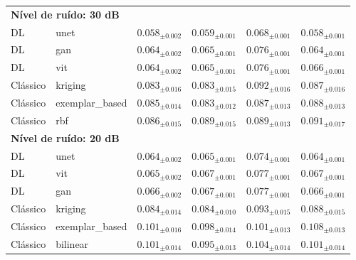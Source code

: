\begin{table}[htbp]
{\begin{tabular}{llcccc}
\midrule
\multicolumn{6}{l}{\textbf{Nível de ruído: 30 dB}} \\
DL & unet & $\mathbf{0.058_{\pm 0.002}}$ & $\mathbf{0.059_{\pm 0.001}}$ & $\mathbf{0.068_{\pm 0.001}}$ & $\mathbf{0.058_{\pm 0.001}}$ \\
DL & gan & \underline{$0.064_{\pm 0.002}$} & \underline{$0.065_{\pm 0.001}$} & \underline{$0.076_{\pm 0.001}$} & \underline{$0.064_{\pm 0.001}$} \\
DL & vit & \textit{$0.064_{\pm 0.002}$} & \textit{$0.065_{\pm 0.001}$} & \textit{$0.076_{\pm 0.001}$} & \textit{$0.066_{\pm 0.001}$} \\
Clássico & kriging & $0.083_{\pm 0.016}$ & $0.083_{\pm 0.015}$ & $0.092_{\pm 0.016}$ & $0.087_{\pm 0.016}$ \\
Clássico & exemplar\_based & $0.085_{\pm 0.014}$ & $0.083_{\pm 0.012}$ & $0.087_{\pm 0.013}$ & $0.088_{\pm 0.013}$ \\
Clássico & rbf & $0.086_{\pm 0.015}$ & $0.089_{\pm 0.015}$ & $0.089_{\pm 0.013}$ & $0.091_{\pm 0.017}$ \\
\midrule
\multicolumn{6}{l}{\textbf{Nível de ruído: 20 dB}} \\
DL & unet & $\mathbf{0.064_{\pm 0.002}}$ & $\mathbf{0.065_{\pm 0.001}}$ & $\mathbf{0.074_{\pm 0.001}}$ & $\mathbf{0.064_{\pm 0.001}}$ \\
DL & vit & \underline{$0.065_{\pm 0.002}$} & \textit{$0.067_{\pm 0.001}$} & \underline{$0.077_{\pm 0.001}$} & \textit{$0.067_{\pm 0.001}$} \\
DL & gan & \textit{$0.066_{\pm 0.002}$} & \underline{$0.067_{\pm 0.001}$} & \textit{$0.077_{\pm 0.001}$} & \underline{$0.066_{\pm 0.001}$} \\
Clássico & kriging & $0.084_{\pm 0.014}$ & $0.084_{\pm 0.010}$ & $0.093_{\pm 0.015}$ & $0.088_{\pm 0.015}$ \\
Clássico & exemplar\_based & $0.101_{\pm 0.016}$ & $0.098_{\pm 0.014}$ & $0.101_{\pm 0.013}$ & $0.108_{\pm 0.013}$ \\
Clássico & bilinear & $0.101_{\pm 0.014}$ & $0.095_{\pm 0.013}$ & $0.104_{\pm 0.014}$ & $0.101_{\pm 0.014}$ \\
\bottomrule
\end{tabular}
}
\end{table}
